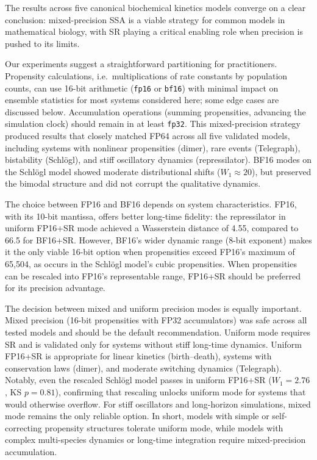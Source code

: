 \documentclass{article}
\begin{document}
The results across five canonical biochemical kinetics models converge on a clear conclusion: mixed-precision SSA is a viable strategy for common models in mathematical biology, with SR playing a critical enabling role when precision is pushed to its limits.

Our experiments suggest a straightforward partitioning for practitioners. Propensity calculations, i.e.\ multiplications of rate constants by population counts, can use 16-bit arithmetic (\texttt{fp16} or \texttt{bf16}) with minimal impact on ensemble statistics for most systems considered here; some edge cases are discussed below. Accumulation operations (summing propensities, advancing the simulation clock) should remain in at least \texttt{fp32}. This mixed-precision strategy produced results that closely matched FP64 across all five validated models, including systems with nonlinear propensities (dimer), rare events (Telegraph), bistability (Schl\"{o}gl), and stiff oscillatory dynamics (repressilator). BF16 modes on the Schl\"{o}gl model showed moderate distributional shifts ($W_1 \approx 20$), but preserved the bimodal structure and did not corrupt the qualitative dynamics.

The choice between FP16 and BF16 depends on system characteristics. FP16, with its 10-bit mantissa, offers better long-time fidelity: the repressilator in uniform FP16+SR mode achieved a Wasserstein distance of 4.55, compared to 66.5 for BF16+SR. However, BF16's wider dynamic range (8-bit exponent) makes it the only viable 16-bit option when propensities exceed FP16's maximum of 65,504, as occurs in the Schl\"{o}gl model's cubic propensities. When propensities can be rescaled into FP16's representable range, FP16+SR should be preferred for its precision advantage.

The decision between mixed and uniform precision modes is equally important. Mixed precision (16-bit propensities with FP32 accumulators) was safe across all tested models and should be the default recommendation. Uniform mode requires SR and is validated only for systems without stiff long-time dynamics. Uniform FP16+SR is appropriate for linear kinetics (birth--death), systems with conservation laws (dimer), and moderate switching dynamics (Telegraph). Notably, even the rescaled Schl\"{o}gl model passes in uniform FP16+SR ($W_1 = 2.76$, KS $p = 0.81$), confirming that rescaling unlocks uniform mode for systems that would otherwise overflow. For stiff oscillators and long-horizon simulations, mixed mode remains the only reliable option. In short, models with simple or self-correcting propensity structures tolerate uniform mode, while models with complex multi-species dynamics or long-time integration require mixed-precision accumulation.
\end{document}
